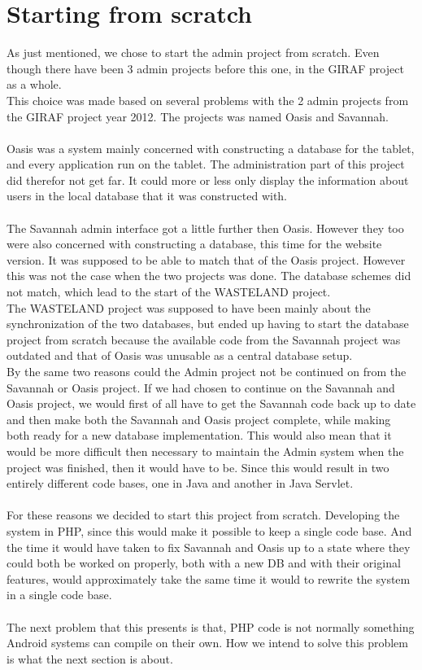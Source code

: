 \section{Starting from scratch}
As just mentioned, we chose to start the admin project from scratch. Even though there have been 3 admin projects before this one, in the GIRAF project as a whole.\\
This choice was made based on several problems with the 2 admin projects from the GIRAF project year 2012. The projects was named Oasis and Savannah.\\
\\
Oasis was a system mainly concerned with constructing a database for the tablet, and every application run on the tablet. The administration part of this project did therefor not get far. It could more or less only display the information about users in the local database that it was constructed with.\\
\\
The Savannah admin interface got a little further then Oasis. However they too were also concerned with constructing a database, this time for the website version. It was supposed to be able to match that of the Oasis project. However this was not the case when the two projects was done. The database schemes did not match, which lead to the start of the WASTELAND project.\\
The WASTELAND project was supposed to have been mainly about the synchronization of the two databases, but ended up having to start the database project from scratch because the available code from the Savannah project was outdated and that of Oasis was unusable as a central database setup.\\
By the same two reasons could the Admin project not be continued on from the Savannah or Oasis project. If we had chosen to continue on the Savannah and Oasis project, we would first of all have to get the Savannah code back up to date and then make both the Savannah and Oasis project complete, while making both ready for a new database implementation. This would also mean that it would be more difficult then necessary to maintain the Admin system when the project was finished, then it would have to be. Since this would result in two entirely different code bases, one in Java and another in Java Servlet.\\
\\
For these reasons we decided to start this project from scratch. Developing the system in PHP, since this would make it possible to keep a single code base. And the time it would have taken to fix Savannah and Oasis up to a state where they could both be worked on properly, both with a new DB and with their original features, would approximately take the same time it would to rewrite the system in a single code base.\\
\\
The next problem that this presents is that, PHP code is not normally something Android systems can compile on their own. How we intend to solve this problem is what the next section is about.

